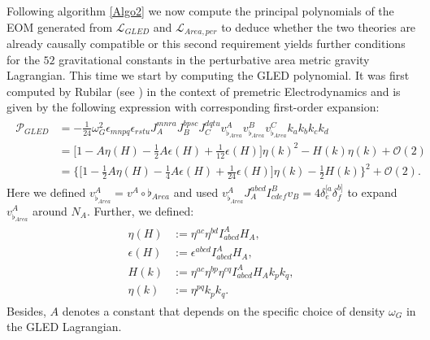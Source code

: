 Following algorithm \ref{Algo2} we now compute the principal polynomials of the EOM generated from $\mathcal{L}_{GLED}$ and $\mathcal{L}_{Area,per}$ to deduce whether the two theories are already causally compatible or this second requirement yields further conditions for the $52$ gravitational constants in the perturbative area metric gravity Lagrangian. This time we start by computing the GLED polynomial. It was first computed by Rubilar (see \cite{2009JPhA...42U5402I}) in the context of premetric Electrodynamics and is given by the following expression with corresponding first-order expansion: 
\begin{align} \label{GLEDPoly}
\begin{aligned}
    \mathcal{P}_{GLED} &= -\frac{1}{24}\omega_G^2\epsilon_{mnpq}\epsilon_{rstu}J_A^{mnra}J_B^{bpsc}J_C^{dqtu} v_{\flat_{Area}}^A v_{\flat_{Area}}^B v_{\flat_{Area}}^C k_ak_bk_ck_d \\
                &= \bigl[ 1 -  A \eta(H)- \frac{1}{2} A \epsilon(H) + \frac{1}{12} \epsilon(H) \bigr] \eta(k)^2 - H(k)\eta(k) + \mathcal{O}(2)\\
                &= \bigl\{  \bigl[ 1 - \frac{1}{2} A \eta(H) - \frac{1}{4} A \epsilon(H) +  \frac{1}{24} \epsilon(H) \bigr] \eta(k) - \frac{1}{2} H(k)       \bigr\}^2 + \mathcal{O}(2).
\end{aligned}
\end{align}
Here we defined $v_{\flat_{Area}}^A = v^A \circ \flat_{Area}$ and used $v_{\flat_{Area}}^A J_A^{abcd} I^B_{cdef}v_B = 4 \delta^{[a}_e \delta^{b]}_f$ to expand $v^A_{\flat_{Area}}$ around $N_A$. Further, we defined:
\begin{align}
\begin{aligned}
\eta(H) &:= \eta^{ac}\eta^{bd} I^A_{abcd} H_A, \\ 
\epsilon(H) &:=\epsilon^{abcd}I^A_{abcd}H_{A},\\ H(k) &:=\eta^{ac}\eta^{bp}\eta^{cq} I^A_{abcd}H_Ak_pk_q, \\ \eta(k)&:=\eta^{pq}k_pk_q.
\end{aligned}
\end{align}
Besides, $A$ denotes a constant that depends on the specific choice of density $\omega_G$ in the GLED Lagrangian.  

